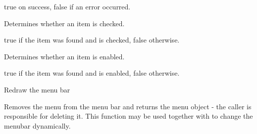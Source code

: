 


true on success, false if an error occurred.



\label{wxmenubarischecked}


Determines whether an item is checked.




true if the item was found and is checked, false otherwise.

\label{wxmenubarisenabled}


Determines whether an item is enabled.




true if the item was found and is enabled, false otherwise.

\label{wxmenubarrefresh}


Redraw the menu bar

\label{wxmenubarremove}


Removes the menu from the menu bar and returns the menu object - the caller is
responsible for deleting it. This function may be used together with 
 to change the menubar
dynamically.



\label{wxmenubarreplace}


